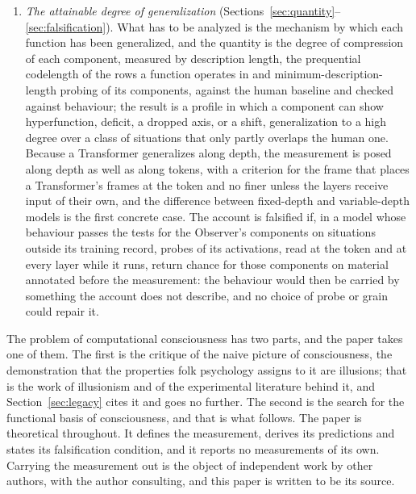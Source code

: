 \begin{enumerate}
  never named, and a next-symbol predictor induces the unnamed part because to generalize is to
  compress. Its state across time is symbolic and lives in the context, its vector state lives below
  the token, its frame is bounded from below by one token, and the high-level functions are not
  localized at the level of tokens, so that their local correlates are as hard to find as they are in a
  brain.
\item \emph{The attainable degree of generalization} (Sections~\ref{sec:quantity}--\ref{sec:falsification}).
  What has to be analyzed is the mechanism by which each function has been generalized, and the
  quantity is the degree of compression of each component, measured by description length, the
  prequential codelength of the rows a function operates in and minimum-description-length probing of
  its components, against the human baseline and checked against behaviour; the result is a profile in which a
  component can show hyperfunction, deficit, a dropped axis, or a shift, generalization to a high
  degree over a class of situations that only partly overlaps the human one. Because a Transformer generalizes along
  depth, the measurement is posed along depth as well as along tokens, with a criterion for the frame that places
  a Transformer's frames at the token and no finer unless the layers receive input of their own, and the difference between fixed-depth and variable-depth
  models is the first concrete case. The account is falsified if, in a model whose
  behaviour passes the tests for the Observer's components on situations outside its training record,
  probes of its activations, read at the token and at every layer while it runs, return chance for
  those components on material annotated before the measurement: the behaviour would then be carried
  by something the account does not describe, and no choice of probe or grain could repair it.
\end{enumerate}

The problem of computational consciousness has two parts, and the paper takes one of them. The first
is the critique of the naive picture of consciousness, the demonstration that the properties folk
psychology assigns to it are illusions; that is the work of illusionism and of the experimental
literature behind it, and Section~\ref{sec:legacy} cites it and goes no further. The second is the
search for the functional basis of consciousness, and that is what follows. The paper is theoretical
throughout. It defines the measurement, derives its predictions and states its falsification
condition, and it reports no measurements of its own. Carrying the measurement out is the
object of independent work by other authors, with the author consulting, and this paper is written
to be its source.

